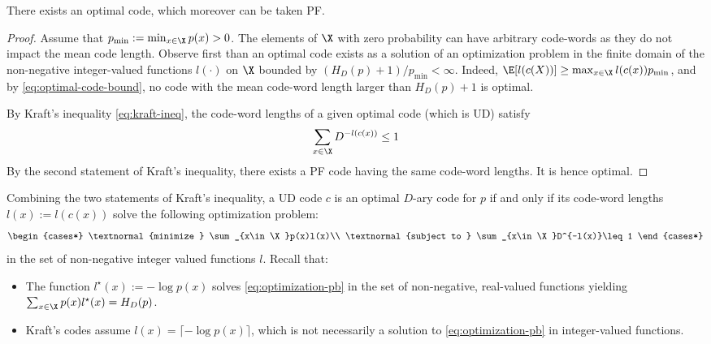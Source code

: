 \documentclass[toc, titlepaged]{../cs-classes/cs-classes}
\begin{document}
\begin{property}
    \label{prop:optimal-code-exists}
    There exists an optimal code, which moreover can be taken PF.
\end{property}
\begin{proof}
    Assume that $p_{\min}:=\min_{x\in\X}p(x)>0$. The elements of $\X$ with zero probability can have arbitrary code-words as they do not impact the mean code length. Observe first than an optimal code exists as a solution of an optimization problem in the finite domain of the non-negative integer-valued functions $l(\cdot)$ on $\X$ bounded by $(H_D(p)+1)/p_{\min}<\infty$. Indeed, $\E[l(c(X))]\geq \max_{x\in\X} l(c(x))p_{\min}$, and by \eqref{eq:optimal-code-bound}, no code with the mean code-word length larger than $H_D(p)+1$ is optimal.

    By Kraft's inequality \eqref{eq:kraft-ineq}, the code-word lengths of a given optimal code (which is UD) satisfy
    \begin{equation*}
        \sum_{x\in\X}D^{-l(c(x))}\leq 1
    \end{equation*}
    By the second statement of Kraft's inequality, there exists a PF code having the same code-word lengths. It is hence optimal.
\end{proof}

\begin{remark}
    Combining the two statements of Kraft's inequality, a UD code $c$ is an optimal $D$-ary code for $p$ if and only if its code-word lengths $l(x):=l(c(x))$ solve the following optimization problem:
    \begin{equation}
        \label{eq:optimization-pb}
        \begin{cases*}
            \textnormal{minimize } \sum_{x\in\X}p(x)l(x)\\
            \textnormal{subject to } \sum_{x\in\X}D^{-l(x)}\leq 1
        \end{cases*}
    \end{equation}
    in the set of non-negative integer valued functions $l$. Recall that:
    \begin{itemize}
        \item The function $l^\star(x):=-\log p(x)$ solves \eqref{eq:optimization-pb} in the set of non-negative, real-valued functions yielding $\sum_{x\in\X}p(x)l^\star(x)=H_D(p)$.
        \item Kraft's codes assume $l(x)=\lceil -\log p(x)\rceil$, which is not necessarily a solution to \eqref{eq:optimization-pb} in integer-valued functions.
    \end{itemize}
\end{remark}
\end{document}
